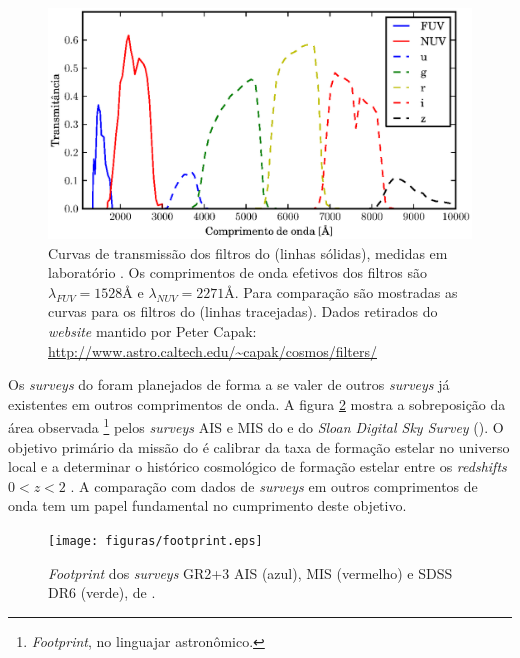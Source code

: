\begin{figure}
	\includegraphics{figuras/galex-filters.eps}
	\caption[Curvas de transmissão dos filtros do \galex.]
	{Curvas de transmissão dos filtros do \galex (linhas sólidas), medidas em
	laboratório \citep{Morrissey2005}. Os comprimentos de onda efetivos dos
	filtros são $\lambda_{FUV}=1528\text{\AA}$ e $\lambda_{NUV}=2271\text{\AA}$.
	Para comparação são mostradas as curvas para os filtros do \SDSS (linhas
	tracejadas). Dados retirados do {\em website} mantido por Peter Capak:
	\url{http://www.astro.caltech.edu/~capak/cosmos/filters/}}
	\label{fig:GalexFilters}
\end{figure}

Os {\em surveys} do \galex foram planejados de forma a se valer de outros {\em
surveys} já existentes em outros comprimentos de onda. A figura
\ref{fig:GalexSDSSOverlap} mostra a sobreposição da área observada
\footnote{{\em Footprint}, no linguajar astronômico.} pelos {\em surveys} AIS e
MIS do \galex e do {\em Sloan Digital Sky Survey} (\SDSS). O objetivo primário da
missão do \galex é calibrar da taxa de formação estelar no universo local e a
determinar o histórico cosmológico de formação estelar entre os {\em redshifts}
$0 < z < 2$ \citep{Martin2005}. A comparação com dados de {\em surveys} em outros
comprimentos de onda tem um papel fundamental no cumprimento deste objetivo.

\begin{figure}
	\texttt{[image: figuras/footprint.eps]}
	\caption[{\em Footprint} dos {\em surveys} \galex AIS, MIS e SDSS]
	{{\em Footprint} dos {\em surveys} \galex GR2+3 AIS (azul), MIS (vermelho) e
	SDSS DR6 (verde), de \citet{Budavari2009}.}
	\label{fig:GalexSDSSOverlap}
\end{figure}




